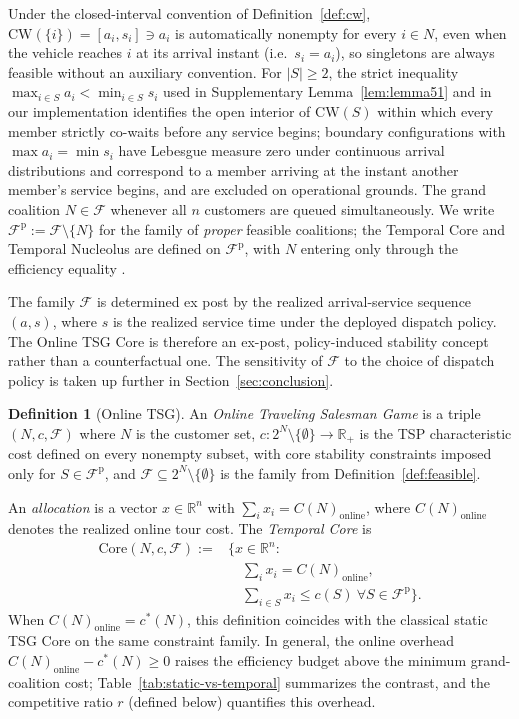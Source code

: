 \documentclass[11pt]{article}
\theoremstyle{plain}
\theoremstyle{definition}
\newtheorem{definition}[theorem]{Definition}
\theoremstyle{remark}
\newcommand{\F}{\mathcal{F}}
\newcommand{\Fp}{\mathcal{F}^{\mathrm{p}}}
\newcommand{\CW}{\mathrm{CW}}
\newcommand{\cstar}{c^{\ast}}
\begin{document}
Under the closed-interval convention of Definition~\ref{def:cw}, $\CW(\{i\})=[a_i,s_i]\ni a_i$ is automatically nonempty for every $i\in N$, even when the vehicle reaches $i$ at its arrival instant (i.e.\ $s_i=a_i$), so singletons are always feasible without an auxiliary convention. For $|S|\ge 2$, the strict inequality $\max_{i\in S}a_i<\min_{i\in S}s_i$ used in Supplementary Lemma~\ref{lem:lemma51} and in our implementation identifies the open interior of $\CW(S)$ within which every member strictly co-waits before any service begins; boundary configurations with $\max a_i=\min s_i$ have Lebesgue measure zero under continuous arrival distributions and correspond to a member arriving at the instant another member's service begins, and are excluded on operational grounds. The grand coalition $N\in\F$ whenever all $n$ customers are queued simultaneously. We write $\Fp := \F\setminus\{N\}$ for the family of \emph{proper} feasible coalitions; the Temporal Core and Temporal Nucleolus are defined on $\Fp$, with $N$ entering only through the efficiency equality \citep{myerson1977graphs,bilbao2000}.

The family $\F$ is determined ex post by the realized arrival-service sequence $(a,s)$, where $s$ is the realized service time under the deployed dispatch policy. The Online TSG Core is therefore an ex-post, policy-induced stability concept rather than a counterfactual one. The sensitivity of $\F$ to the choice of dispatch policy is taken up further in Section~\ref{sec:conclusion}.

\begin{definition}[Online TSG]
\label{def:online-tsg}
An \emph{Online Traveling Salesman Game} is a triple $(N, c, \F)$ where $N$ is the customer set, $c:2^N\setminus\{\emptyset\}\to\mathbb{R}_+$ is the TSP characteristic cost defined on every nonempty subset, with core stability constraints imposed only for $S\in\Fp$, and $\F\subseteq 2^N\setminus\{\emptyset\}$ is the family from Definition~\ref{def:feasible}.
\end{definition}

An \emph{allocation} is a vector $x\in\mathbb{R}^n$ with $\sum_i x_i = C(N)_{\text{online}}$, where $C(N)_{\text{online}}$ denotes the realized online tour cost. The \emph{Temporal Core} is
\[
\begin{aligned}
\mathrm{Core}(N,c,\F) := {} & \bigl\{ x\in\mathbb{R}^n : \\
& \quad \textstyle\sum_i x_i = C(N)_{\text{online}}, \\
& \quad \textstyle\sum_{i\in S} x_i \le c(S)\ \forall S\in\Fp \bigr\}.
\end{aligned}
\]
When $C(N)_{\text{online}} = \cstar(N)$, this definition coincides with the classical \citet{potters1992tsg} static TSG Core on the same constraint family. In general, the online overhead $C(N)_{\text{online}}-\cstar(N)\ge 0$ raises the efficiency budget above the minimum grand-coalition cost; Table~\ref{tab:static-vs-temporal} summarizes the contrast, and the competitive ratio $r$ (defined below) quantifies this overhead.
\end{document}
